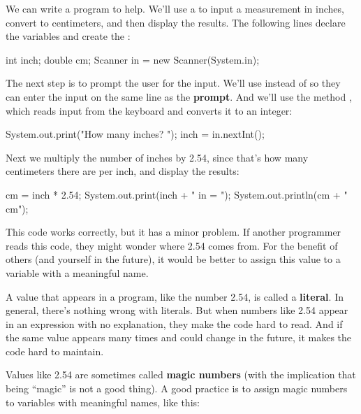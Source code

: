 We can write a program to help.
We'll use a  to input a measurement in inches, convert to centimeters, and then display the results.
The following lines declare the variables and create the :

\begin{code}
int inch;
double cm;
Scanner in = new Scanner(System.in);
\end{code}


The next step is to prompt the user for the input.
We'll use  instead of  so they can enter the input on the same line as the {\bf prompt}.
And we'll use the  method , which reads input from the keyboard and converts it to an integer:

\begin{code}
System.out.print("How many inches? ");
inch = in.nextInt();
\end{code}

Next we multiply the number of inches by 2.54, since that's how many centimeters there are per inch, and display the results:

\begin{code}
cm = inch * 2.54;
System.out.print(inch + " in = ");
System.out.println(cm + " cm");
\end{code}

This code works correctly, but it has a minor problem.
If another programmer reads this code, they might wonder where 2.54 comes from.
For the benefit of others (and yourself in the future), it would be better to assign this value to a variable with a meaningful name.




A value that appears in a program, like the number 2.54, is called a {\bf literal}.
In general, there's nothing wrong with literals.
But when numbers like 2.54 appear in an expression with no explanation, they make the code hard to read.
And if the same value appears many times and could change in the future, it makes the code hard to maintain.


Values like 2.54 are sometimes called {\bf magic numbers} (with the implication that being ``magic'' is not a good thing).
A good practice is to assign magic numbers to variables with meaningful names, like this:

